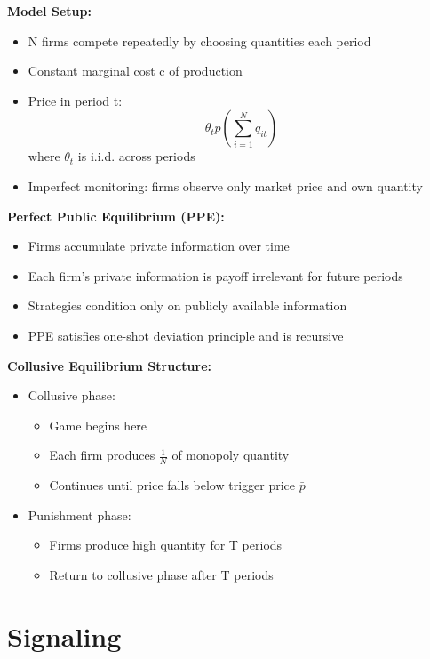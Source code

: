 \documentclass[11pt]{elegantbook_2}
\begin{document}
\textbf{Model Setup:}
\begin{itemize}
    \item N firms compete repeatedly by choosing quantities each period
    \item Constant marginal cost c of production
    \item Price in period t: $$\theta_t p(\sum_{i=1}^N q_{it})$$ where $\theta_t$ is i.i.d. across periods
    \item Imperfect monitoring: firms observe only market price and own quantity
\end{itemize}

\textbf{Perfect Public Equilibrium (PPE):}
\begin{itemize}
    \item Firms accumulate private information over time
    \item Each firm's private information is payoff irrelevant for future periods
    \item Strategies condition only on publicly available information
    \item PPE satisfies one-shot deviation principle and is recursive
\end{itemize}

\textbf{Collusive Equilibrium Structure:}
\begin{itemize}
    \item Collusive phase:
        \begin{itemize}
            \item Game begins here
            \item Each firm produces $\frac{1}{N}$ of monopoly quantity
            \item Continues until price falls below trigger price $\bar{p}$
        \end{itemize}
    \item Punishment phase:
        \begin{itemize}
            \item Firms produce high quantity for T periods
            \item Return to collusive phase after T periods
        \end{itemize}
\end{itemize}








\chapter{Signaling}
\end{document}
